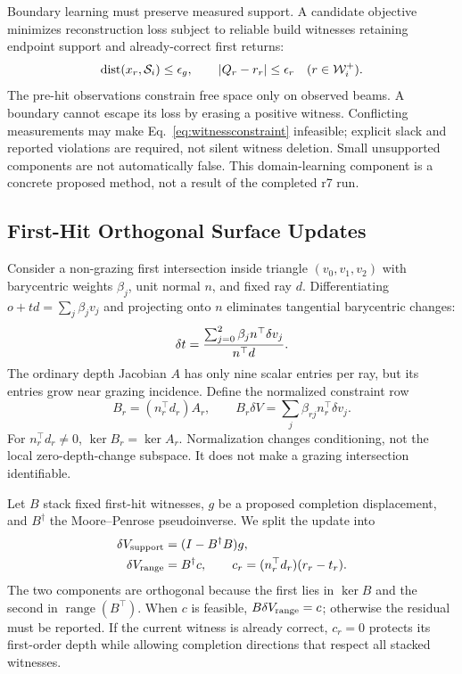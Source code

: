 Boundary learning must preserve measured support. A candidate objective minimizes reconstruction loss subject to reliable build witnesses retaining endpoint support and already-correct first returns:
\begin{equation}
 \operatorname{dist}(x_r,\mathcal S_i)\leq\epsilon_g,
 \qquad |Q_r-r_r|\leq\epsilon_r
 \quad(r\in\mathcal W_i^+).
 \label{eq:witnessconstraint}
\end{equation}
The pre-hit observations constrain free space only on observed beams. A boundary cannot escape its loss by erasing a positive witness. Conflicting measurements may make Eq.~\ref{eq:witnessconstraint} infeasible; explicit slack and reported violations are required, not silent witness deletion. Small unsupported components are not automatically false. This domain-learning component is a concrete proposed method, not a result of the completed r7 run.

\subsection{First-Hit Orthogonal Surface Updates}
\label{sec:orthogonal}
Consider a non-grazing first intersection inside triangle $(v_0,v_1,v_2)$ with barycentric weights $\beta_j$, unit normal $n$, and fixed ray $d$. Differentiating $o+td=\sum_j\beta_jv_j$ and projecting onto $n$ eliminates tangential barycentric changes:
\begin{equation}
 \delta t={\sum_{j=0}^2\beta_j n^\top\delta v_j\over n^\top d}.
 \label{eq:hitjac}
\end{equation}
The ordinary depth Jacobian $A$ has only nine scalar entries per ray, but its entries grow near grazing incidence. Define the normalized constraint row
\begin{equation}
 B_r=(n_r^\top d_r)A_r,
 \qquad B_r\delta V=\sum_j\beta_{rj}n_r^\top\delta v_j.
 \label{eq:normalized}
\end{equation}
For $n_r^\top d_r\ne0$, $\ker B_r=\ker A_r$. Normalization changes conditioning, not the local zero-depth-change subspace. It does not make a grazing intersection identifiable.

Let $B$ stack fixed first-hit witnesses, $g$ be a proposed completion displacement, and $B^\dagger$ the Moore--Penrose pseudoinverse. We split the update into
\begin{align}
 \delta V_{\rm support}&=(I-B^\dagger B)g,\\
 \delta V_{\rm range}&=B^\dagger c,\qquad
 c_r=(n_r^\top d_r)(r_r-t_r).
 \label{eq:split}
\end{align}
The two components are orthogonal because the first lies in $\ker B$ and the second in $\operatorname{range}(B^\top)$. When $c$ is feasible, $B\delta V_{\rm range}=c$; otherwise the residual must be reported. If the current witness is already correct, $c_r=0$ protects its first-order depth while allowing completion directions that respect all stacked witnesses.

